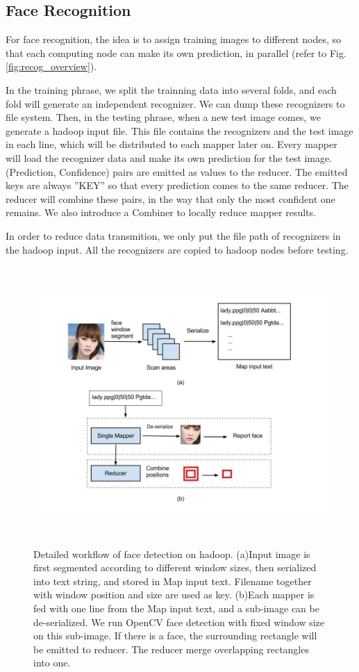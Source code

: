 \documentclass[11pt, draftclsnofoot, onecolumn]{IEEEtran}
\begin{document}
\subsection{Face Recognition}

For face recognition, the idea is to assign training images to different nodes, so that each computing node can make its own prediction, in parallel (refer to Fig.\ref{fig:recog_overview}). 

In the training phrase, we split the trainning data into several folds, and each fold will generate an independent recognizer. We can dump these recognizers to file system. Then, in the testing phrase, when a new test image comes, we generate a hadoop input file. This file contains the recognizers and the test image in each line, which will be distributed to each mapper later on. Every mapper will load the recognizer data and make its own prediction for the test image. (Prediction, Confidence) pairs are emitted as values to the reducer. The emitted keys are always ''KEY'' so that every prediction comes to the same reducer. The reducer will combine these pairs, in the way that only the most confident one remains. We also introduce a Combiner to locally reduce mapper results.

In order to reduce data transmition, we only put the file path of recognizers in the hadoop input. All the recognizers are copied to hadoop nodes before testing.

\begin{figure}
\centering
\includegraphics[height=300pt]{hadoop_face_detection}
\caption{Detailed workflow of face detection on hadoop. (a)Input image is first segmented according to different window sizes, then serialized into text string, and stored in Map input text. Filename together with window position and size are used as key. (b)Each mapper is fed with one line from the Map input text, and a sub-image can be de-serialized. We run OpenCV face detection with fixed window size on this sub-image. If there is a face, the surrounding rectangle will be emitted to reducer. The reducer merge overlapping rectangles into one.}
\label{fig:hadoop_face_detection}
\end{figure}
\end{document}
